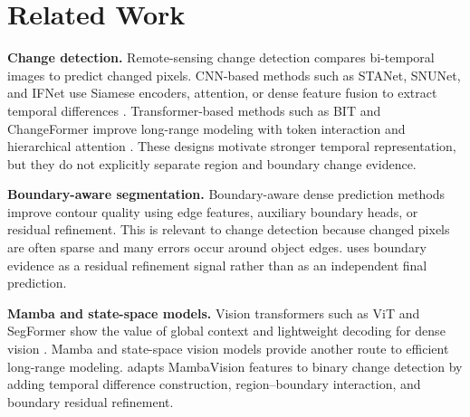 \section{Related Work}

\textbf{Change detection.}
Remote-sensing change detection compares bi-temporal images to predict changed pixels. CNN-based methods such as STANet, SNUNet, and IFNet use Siamese encoders, attention, or dense feature fusion to extract temporal differences \cite{STANet,SNUNet,IFNet}. Transformer-based methods such as BIT and ChangeFormer improve long-range modeling with token interaction and hierarchical attention \cite{BIT,ChangeFormer}. These designs motivate stronger temporal representation, but they do not explicitly separate region and boundary change evidence.

\textbf{Boundary-aware segmentation.}
Boundary-aware dense prediction methods improve contour quality using edge features, auxiliary boundary heads, or residual refinement. This is relevant to change detection because changed pixels are often sparse and many errors occur around object edges. \ours{} uses boundary evidence as a residual refinement signal rather than as an independent final prediction.

\textbf{Mamba and state-space models.}
Vision transformers such as ViT and SegFormer show the value of global context and lightweight decoding for dense vision \cite{ViT,SegFormer}. Mamba and state-space vision models provide another route to efficient long-range modeling. \ours{} adapts MambaVision features to binary change detection by adding temporal difference construction, region--boundary interaction, and boundary residual refinement.
